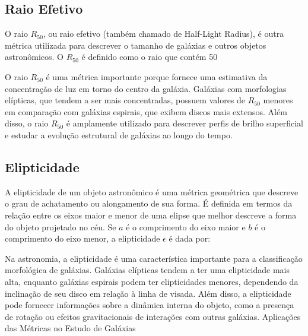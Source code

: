 \subsection{Raio Efetivo}
O raio $R_{50}$, ou raio efetivo (também chamado de Half-Light Radius), é outra métrica utilizada para descrever o tamanho de galáxias e outros objetos astronômicos. O $R_{50}$ é definido como o raio que contém 50%


O raio $R_{50}$ é uma métrica importante porque fornece uma estimativa da concentração de luz em torno do centro da galáxia. Galáxias com morfologias elípticas, que tendem a ser mais concentradas, possuem valores de $R_{50}$ menores em comparação com galáxias espirais, que exibem discos mais extensos. Além disso, o raio $R_{50}$ é amplamente utilizado para descrever perfis de brilho superficial e estudar a evolução estrutural de galáxias ao longo do tempo.


\subsection{Elipticidade}
A elipticidade de um objeto astronômico é uma métrica geométrica que descreve o grau de achatamento ou alongamento de sua forma. É definida em termos da relação entre os eixos maior e menor de uma elipse que melhor descreve a forma do objeto projetado no céu. Se $a$ é o comprimento do eixo maior e $b$ é o comprimento do eixo menor, a elipticidade $\epsilon$ é dada por:


Na astronomia, a elipticidade é uma característica importante para a classificação morfológica de galáxias. Galáxias elípticas tendem a ter uma elipticidade mais alta, enquanto galáxias espirais podem ter elipticidades menores, dependendo da inclinação de seu disco em relação à linha de visada. Além disso, a elipticidade pode fornecer informações sobre a dinâmica interna do objeto, como a presença de rotação ou efeitos gravitacionais de interações com outras galáxias.
Aplicações das Métricas no Estudo de Galáxias

